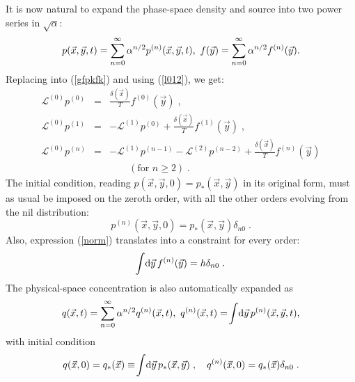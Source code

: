 It is now natural to expand the phase-space density and source into two power series in $\sqrt{\alpha}$:
\begin{equation} \label{esp}
 p(\xyt)=\sum_{n=0}^{\infty}\alpha^{n/2}p^{(n)}(\xyt),\ f(\vec{y})=\sum_{n=0}^{\infty}\alpha^{n/2}f^{(n)}(\vec{y}).
\end{equation}
Replacing into (\ref{gfpkfk}) and using (\ref{l012}), we get:
\begin{eqnarray} \label{label}
 \mathcal{L}^{(0)}p^{(0)}&=&\frac{\delta(\vec{x})}{T}f^{(0)}(\vec{y})\;,\nonumber\\
 \mathcal{L}^{(0)}p^{(1)}&=&-\mathcal{L}^{(1)}p^{(0)}+\frac{\delta(\vec{x})}{T}f^{(1)}(\vec{y})\;,\nonumber\\
 \mathcal{L}^{(0)}p^{(n)}&=&-\mathcal{L}^{(1)}p^{(n-1)}-\mathcal{L}^{(2)}p^{(n-2)}+\frac{\delta(\vec{x})}{T}f^{(n)}(\vec{y})\nonumber\\
 &&\qquad(\textrm{for }n\ge2)\;.
\end{eqnarray}
The initial condition, reading $p(\vec{x},\vec{y},0)=p_*(\vec{x},\vec{y})$ in its original form, must as usual be imposed on the zeroth order,
with all the other orders evolving from the nil distribution:
\begin{equation} \label{ini}
 p^{(n)}(\vec{x},\vec{y},0)=p_*(\vec{x},\vec{y})\delta_{n0}\;.
\end{equation}
Also, expression (\ref{norm}) translates into a constraint for every order:
\begin{equation} \label{normal}
 \!\int\!\mathrm{d}\vec{y}\,f^{(n)}(\vec{y})=h\delta_{n0}\;.
\end{equation}
The physical-space concentration is also automatically expanded as
\begin{equation} \label{exp}
 q(\xt)=\sum_{n=0}^{\infty}\alpha^{n/2}q^{(n)}(\xt),\ q^{(n)}(\xt)=\!\int\!\ud\vec{y}\,p^{(n)}(\xyt),
\end{equation}
with initial condition
\begin{equation} \label{in}
 q(\vec{x},0)=q_*(\vec{x})\equiv\!\int\!\mathrm{d}\vec{y}\,p_*(\vec{x},\vec{y})\;,\quad q^{(n)}(\vec{x},0)=q_*(\vec{x})\delta_{n0}\;.
\end{equation}

